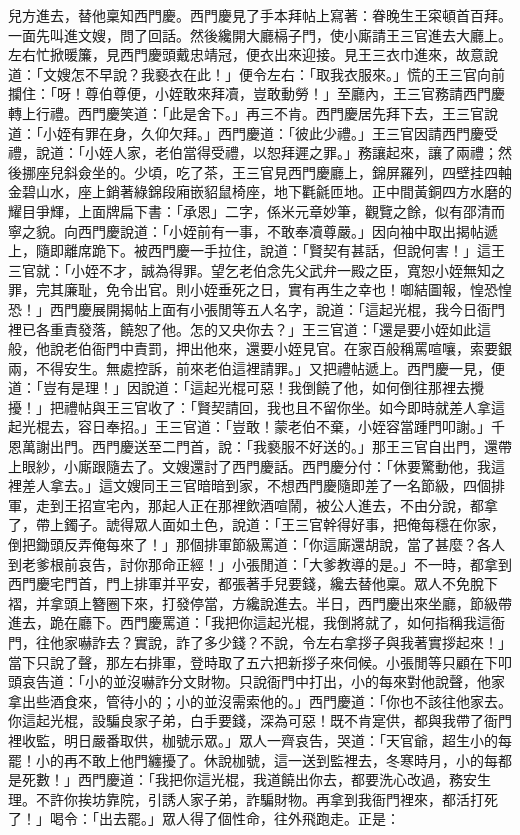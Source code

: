 兒方進去，替他稟知西門慶。西門慶見了手本拜帖上寫著：眷晚生王寀頓首百拜。一面先叫進文嫂，問了回話。然後纔開大廳槅子門，使小廝請王三官進去大廳上。左右忙掀暖簾，見西門慶頭戴忠靖冠，便衣出來迎接。見王三衣巾進來，故意說道：「文嫂怎不早說？我褻衣在此！」便令左右：「取我衣服來。」慌的王三官向前攔住：「呀！尊伯尊便，小姪敢來拜凟，豈敢動勞！」至廳內，王三官務請西門慶轉上行禮。西門慶笑道：「此是舍下。」再三不肯。西門慶居先拜下去，王三官說道：「小姪有罪在身，久仰欠拜。」西門慶道：「彼此少禮。」王三官因請西門慶受禮，說道：「小姪人家，老伯當得受禮，以恕拜遲之罪。」務讓起來，讓了兩禮；然後挪座兒斜僉坐的。少頃，吃了茶，王三官見西門慶廳上，錦屏羅列，四壁挂四軸金碧山水，座上銷著綠錦段廂嵌貂鼠椅座，地下氍毹匝地。正中間黃銅四方水磨的耀目爭輝，上面牌扁下書：「承恩」二字，係米元章妙筆，觀覽之餘，似有邵清而寧之貌。向西門慶說道：「小姪前有一事，不敢奉凟尊嚴。」因向袖中取出揭帖遞上，隨即離席跪下。被西門慶一手拉住，說道：「賢契有甚話，但說何害！」這王三官就：「小姪不才，誠為得罪。望乞老伯念先父武弁一殿之臣，寬恕小姪無知之罪，完其廉耻，免令出官。則小姪垂死之日，實有再生之幸也！啣結圖報，惶恐惶恐！」西門慶展開揭帖上面有小張閒等五人名字，說道：「這起光棍，我今日衙門裡已各重責發落，饒恕了他。怎的又央你去？」王三官道：「還是要小姪如此這般，他說老伯衙門中責罰，押出他來，還要小姪見官。在家百般稱罵喧嚷，索要銀兩，不得安生。無處控訴，前來老伯這裡請罪。」又把禮帖遞上。西門慶一見，便道：「豈有是理！」因說道：「這起光棍可惡！我倒饒了他，如何倒往那裡去攪擾！」把禮帖與王三官收了：「賢契請回，我也且不留你坐。如今即時就差人拿這起光棍去，容日奉招。」王三官道：「豈敢！蒙老伯不棄，小姪容當踵門叩謝。」千恩萬謝出門。西門慶送至二門首，說：「我褻服不好送的。」那王三官自出門，還帶上眼紗，小廝跟隨去了。文嫂還討了西門慶話。西門慶分付：「休要驚動他，我這裡差人拿去。」這文嫂同王三官暗暗到家，不想西門慶隨即差了一名節級，四個排軍，走到王招宣宅內，那起人正在那裡飲酒喧鬧，被公人進去，不由分說，都拿了，帶上鐲子。諕得眾人面如土色，說道：「王三官幹得好事，把俺每穩在你家，倒把鋤頭反弄俺每來了！」那個排軍節級罵道：「你這廝還胡說，當了甚麼？各人到老爹根前哀告，討你那命正經！」小張閒道：「大爹教導的是。」不一時，都拿到西門慶宅門首，門上排軍并平安，都張著手兒要錢，纔去替他稟。眾人不免脫下褶，并拿頭上簪圈下來，打發停當，方纔說進去。半日，西門慶出來坐廳，節級帶進去，跪在廳下。西門慶罵道：「我把你這起光棍，我倒將就了，如何指稱我這衙門，往他家嚇詐去？實說，詐了多少錢？不說，令左右拿拶子與我著實拶起來！」當下只說了聲，那左右排軍，登時取了五六把新拶子來伺候。小張閒等只顧在下叩頭哀告道：「小的並沒嚇詐分文財物。只說衙門中打出，小的每來對他說聲，他家拿出些酒食來，管待小的；小的並沒需索他的。」西門慶道：「你也不該往他家去。你這起光棍，設騙良家子弟，白手要錢，深為可惡！既不肯寔供，都與我帶了衙門裡收監，明日嚴番取供，枷號示眾。」眾人一齊哀告，哭道：「天官爺，超生小的每罷！小的再不敢上他門纏擾了。休說枷號，這一送到監裡去，冬寒時月，小的每都是死數！」西門慶道：「我把你這光棍，我道饒出你去，都要洗心改過，務安生理。不許你挨坊靠院，引誘人家子弟，詐騙財物。再拿到我衙門裡來，都活打死了！」喝令：「出去罷。」眾人得了個性命，往外飛跑走。正是：

